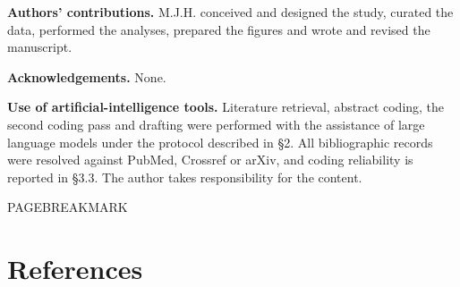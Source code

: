 \documentclass{article}
\begin{document}
\textbf{Authors' contributions.} M.J.H. conceived and designed the
study, curated the data, performed the analyses, prepared the figures
and wrote and revised the manuscript.

\textbf{Acknowledgements.} None.

\textbf{Use of artificial-intelligence tools.} Literature retrieval,
abstract coding, the second coding pass and drafting were performed with
the assistance of large language models under the protocol described in
§2. All bibliographic records were resolved against PubMed, Crossref or
arXiv, and coding reliability is reported in §3.3. The author takes
responsibility for the content.


PAGEBREAKMARK

\section{References}\label{references}
\end{document}
